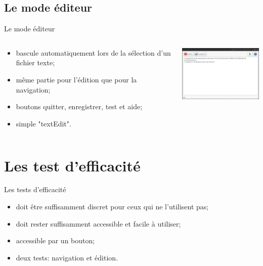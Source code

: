 \documentclass{beamer}
\begin{document}
	\subsection{Le mode éditeur}

\begin{frame}{Le mode éditeur}

	\begin{columns}[c]
	
	\begin{column}{5cm}
	\begin{itemize}
		\item bascule automatiquement lors de la sélection d'un fichier texte;
		\item même partie pour l'édition que pour la navigation;
		\item boutons quitter, enregistrer, test et aide;
		\item simple "textEdit".
	\end{itemize}
  	\end{column}
	\begin{column}{5cm}
		\includegraphics[width=5cm]{editor}\\
  	\end{column}

	\end{columns}


\end{frame}


	\section{Les test d'efficacité}
	
\begin{frame}{Les tests d'efficacité}

	\begin{itemize}
		\item doit être suffisamment discret pour ceux qui ne l'utilisent pas;
		\item doit rester suffisamment accessible et facile à utiliser;
		\item accessible par un bouton;
		\item deux tests: navigation et édition.
	\end{itemize}

\end{frame}
\end{document}
